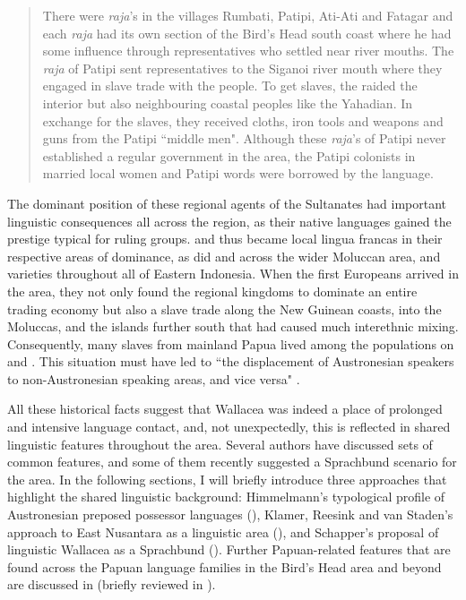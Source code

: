 \begin{quote}There were \textit{raja}'s in the villages Rumbati, Patipi, Ati-Ati and Fatagar and each \textit{raja} had its own section of the Bird's Head south coast where he had some influence through representatives who settled near river mouths. The \textit{raja} of Patipi sent representatives to the Siganoi river mouth where they engaged in slave trade with the  people. To get slaves, the  raided the interior but also neighbouring coastal peoples like the Yahadian. In exchange for the slaves, they received cloths, iron tools and weapons and guns from the Patipi ``middle men". Although these \textit{raja}'s of Patipi never established a regular government in the  area, the Patipi colonists in  married local women and Patipi words were borrowed by the  language.\end{quote}

The dominant position of these regional agents of the Sultanates had important linguistic consequences all across the region, as their native languages gained the prestige typical for ruling groups.  and  thus became local lingua francas in their respective areas of dominance, as did  and  across the wider Moluccan area, and  varieties throughout all of Eastern Indonesia. When the first Europeans arrived in the area, they not only found the regional kingdoms to dominate an entire trading economy but also a slave trade along the New Guinean coasts, into the Moluccas, and the islands further south that had caused much interethnic mixing. Consequently, many slaves from mainland Papua lived among the populations on  and . This situation must have led to ``the displacement of Austronesian speakers to non-Austronesian speaking areas, and vice versa" \citep[105f.]{klamer2008east}.

All these historical facts suggest that Wallacea was indeed a place of prolonged and intensive language contact, and, not unexpectedly, this is reflected in shared linguistic features throughout the area. Several authors have discussed sets of common features, and some of them recently suggested a Sprachbund scenario for the area. In the following sections, I will briefly introduce three approaches that highlight the shared linguistic background: Himmelmann's typological profile of Austronesian preposed possessor languages (), Klamer, Reesink and van Staden's approach to East Nusantara as a linguistic area (), and Schapper's proposal of linguistic Wallacea as a Sprachbund (). Further Papuan-related features that are found across the Papuan language families in the Bird's Head area and beyond are discussed in \citet{reesink2005west} (briefly reviewed in ).


